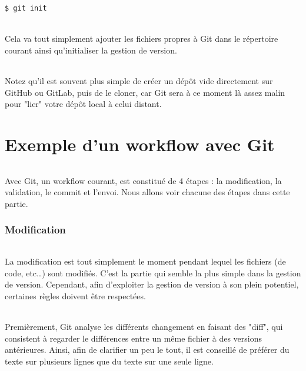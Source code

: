 \documentclass[french, a4paper, 12pt, titlepage]{article}
\begin{document}
\begin{lstlisting}
$ git init
\end{lstlisting}

\paragraph{} Cela va tout simplement ajouter les fichiers propres à Git dans le répertoire courant ainsi qu'initialiser la gestion de version.

\paragraph{} Notez qu'il est souvent plus simple de créer un dépôt vide
directement sur GitHub ou GitLab, puis de le cloner, car Git sera à ce moment
là assez malin pour "lier" votre dépôt local à celui distant.

\newpage
\part{Exemple d'un workflow avec Git}
\paragraph{} Avec Git, un workflow courant, est constitué de 4 étapes : la modification, la validation, le commit et l'envoi. Nous allons voir chacune des étapes dans cette partie.
\section{Modification}
\paragraph{}La modification est tout simplement le moment pendant lequel les fichiers (de code, etc\dots) sont modifiés. C'est la partie qui semble la plus simple dans la gestion de version. Cependant, afin d'exploiter la gestion de version à son plein potentiel, certaines règles doivent être respectées.
\paragraph{}Premièrement, Git analyse les différents changement en faisant des "diff", qui consistent à regarder le différences entre un même fichier à des versions antérieures. Ainsi, afin de clarifier un peu le tout, il est conseillé de préférer du texte sur plusieurs lignes que du texte sur une seule ligne.
\end{document}
